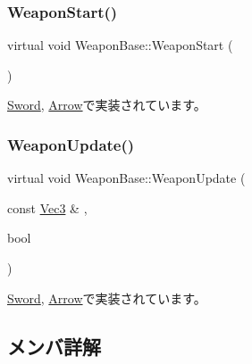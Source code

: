 \mbox{\label{class_weapon_base_a25cd4c351638b76377e93341a9545712}} 
\subsubsection{\texorpdfstring{Weapon\+Start()}{WeaponStart()}}
{\footnotesize\ttfamily virtual void Weapon\+Base\+::\+Weapon\+Start (\begin{DoxyParamCaption}{ }\end{DoxyParamCaption})\hspace{0.3cm}{\ttfamily [pure virtual]}}



\mbox{\hyperlink{class_sword_af9027f627d1db6c0ac21d2aa842cff69}{Sword}}, \mbox{\hyperlink{class_arrow_a085b5bd5f9e3ce25a081b502f9989f33}{Arrow}}で実装されています。

\mbox{\label{class_weapon_base_aa1e3d02353273ab72a71cc3a1563636a}} 
\subsubsection{\texorpdfstring{Weapon\+Update()}{WeaponUpdate()}}
{\footnotesize\ttfamily virtual void Weapon\+Base\+::\+Weapon\+Update (\begin{DoxyParamCaption}\item[{const \mbox{\hyperlink{common_8h_ab1cb35b3a17c398d8ef71d5f779808bf}{Vec3}} \&}]{,  }\item[{bool}]{ }\end{DoxyParamCaption})\hspace{0.3cm}{\ttfamily [pure virtual]}}



\mbox{\hyperlink{class_sword_a5fda2f72829b6256ffc3fb18d9d065e8}{Sword}}, \mbox{\hyperlink{class_arrow_afb6110035cba7b850d12755570163b29}{Arrow}}で実装されています。



\subsection{メンバ詳解}
\mbox{\label{class_weapon_base_a54883e3ecbc54ff42ea381a17ef8cf8f}} 
